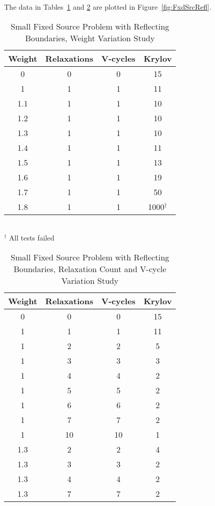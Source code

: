 The data in Tables~\ref{table:FxdSrcTstReflWeight} and \ref{table:FxdSrcTstReflRV} are plotted in Figure~\ref{fig:FxdSrcRefl}.
\begin{table}[!h]
\caption{Small Fixed Source Problem with Reflecting Boundaries, Weight Variation Study}
\begin{center}
\begin{tabular}{|c| c| c| c|}
\hline
Weight & Relaxations & V-cycles & Krylov \\[0.5ex]
\hline
0    & 0 & 0 & 15 \\
1    & 1 & 1 & 11 \\
1.1 & 1 & 1 & 10 \\
1.2 & 1 & 1 & 10 \\
1.3 & 1 & 1 & 10 \\
1.4 & 1 & 1 & 11 \\
1.5 & 1 & 1 & 13 \\
1.6 & 1 & 1 & 19 \\
1.7 & 1 & 1 & 50 \\
1.8 & 1 & 1 & 1000$^{\dagger}$ \\
\hline 
\end{tabular} \\
$^{\dagger}$ All tests failed
\end{center}
\label{table:FxdSrcTstReflWeight}
\end{table}

\begin{table}[!h]
\caption{Small Fixed Source Problem with Reflecting Boundaries, Relaxation Count and V-cycle Variation Study}
\begin{center}
\begin{tabular}{|c |c |c |c|}
\hline
Weight & Relaxations & V-cycles & Krylov \\[0.5ex]
\hline
0  & 0 & 0 & 15 \\
1 & 1 & 1 & 11 \\
1 & 2 & 2 & 5 \\
1 & 3 & 3 & 3 \\
1 & 4 & 4 & 2 \\
1 & 5 & 5 & 2 \\
1 & 6 & 6 & 2 \\
1 & 7 & 7 & 2 \\
1 & 10 & 10 & 1 \\
\hline
1.3 & 2 & 2 & 4 \\
1.3 & 3 & 3 & 2 \\
1.3 & 4 & 4 & 2 \\
1.3 & 7 & 7 & 2 \\
\hline 
\end{tabular}
\end{center}
\label{table:FxdSrcTstReflRV}
\end{table}

